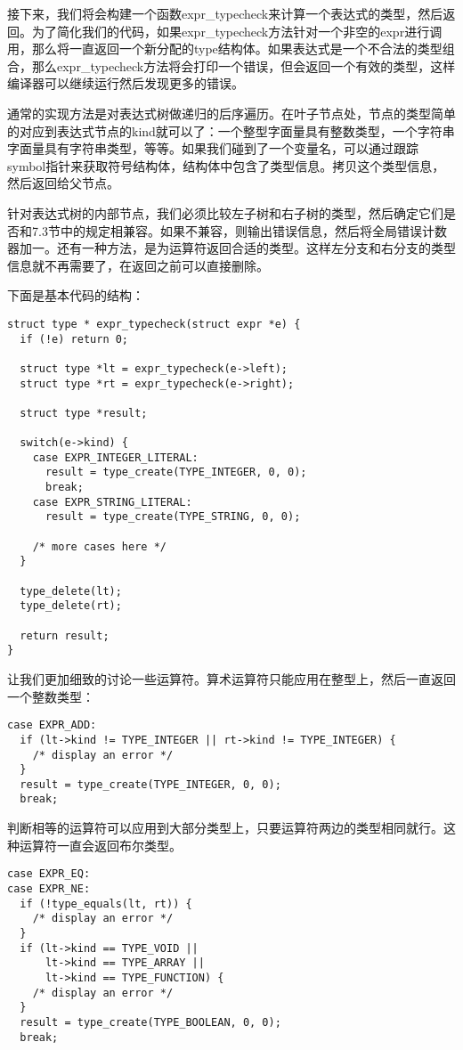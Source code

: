 \documentclass[cn,11pt,chinese]{elegantbook}
\begin{document}
接下来，我们将会构建一个函数expr\_typecheck来计算一个表达式的类型，然后返回。为了简化我们的代码，如果expr\_typecheck方法针对一个非空的expr进行调用，那么将一直返回一个新分配的type结构体。如果表达式是一个不合法的类型组合，那么expr\_typecheck方法将会打印一个错误，但会返回一个有效的类型，这样编译器可以继续运行然后发现更多的错误。

通常的实现方法是对表达式树做递归的后序遍历。在叶子节点处，节点的类型简单的对应到表达式节点的kind就可以了：一个整型字面量具有整数类型，一个字符串字面量具有字符串类型，等等。如果我们碰到了一个变量名，可以通过跟踪symbol指针来获取符号结构体，结构体中包含了类型信息。拷贝这个类型信息，然后返回给父节点。

针对表达式树的内部节点，我们必须比较左子树和右子树的类型，然后确定它们是否和7.3节中的规定相兼容。如果不兼容，则输出错误信息，然后将全局错误计数器加一。还有一种方法，是为运算符返回合适的类型。这样左分支和右分支的类型信息就不再需要了，在返回之前可以直接删除。

下面是基本代码的结构：

\begin{verbatim}
struct type * expr_typecheck(struct expr *e) {
  if (!e) return 0;
    
  struct type *lt = expr_typecheck(e->left);
  struct type *rt = expr_typecheck(e->right);
    
  struct type *result;
  
  switch(e->kind) {
    case EXPR_INTEGER_LITERAL:
      result = type_create(TYPE_INTEGER, 0, 0);
      break;
    case EXPR_STRING_LITERAL:
      result = type_create(TYPE_STRING, 0, 0);
          
    /* more cases here */
  }
    
  type_delete(lt);
  type_delete(rt);
    
  return result;
}
\end{verbatim}

让我们更加细致的讨论一些运算符。算术运算符只能应用在整型上，然后一直返回一个整数类型：

\begin{verbatim}
case EXPR_ADD:
  if (lt->kind != TYPE_INTEGER || rt->kind != TYPE_INTEGER) {
    /* display an error */
  }
  result = type_create(TYPE_INTEGER, 0, 0);
  break;
\end{verbatim}

判断相等的运算符可以应用到大部分类型上，只要运算符两边的类型相同就行。这种运算符一直会返回布尔类型。

\begin{verbatim}
case EXPR_EQ:
case EXPR_NE:
  if (!type_equals(lt, rt)) {
    /* display an error */
  }
  if (lt->kind == TYPE_VOID ||
      lt->kind == TYPE_ARRAY ||
      lt->kind == TYPE_FUNCTION) {
    /* display an error */
  }
  result = type_create(TYPE_BOOLEAN, 0, 0);
  break;
\end{verbatim}
\end{document}
